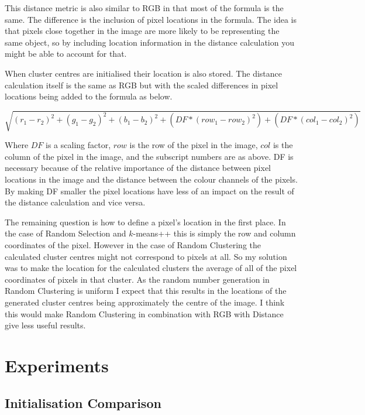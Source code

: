 \documentclass{article}
\begin{document}
This distance metric is also similar to RGB in that most of the formula is the same. The difference is the inclusion of pixel locations in the formula. The idea is that pixels close together in the image are more likely to be representing the same object, so by including location information in the distance calculation you might be able to account for that. 

When cluster centres are initialised their location is also stored. The distance calculation itself is the same as RGB but with the scaled differences in pixel locations being added to the formula as below.

\begin{equation*}
 \sqrt{(r_1-r_2)^2 + (g_1-g_2)^2 + (b_1-b_2)^2 + (DF*(row_1-row_2)^2) + (DF*(col_1-col_2)^2)}	
\end{equation*}


Where $DF$ is a scaling factor, $row$ is the row of the pixel in the image, $col$ is the column of the pixel in the image, and the subscript numbers are as above.
DF is necessary because of the relative importance of the distance between pixel locations in the image and the distance between the colour channels of the pixels. By making DF smaller the pixel locations have less of an impact on the result of the distance calculation and vice versa. 

The remaining question is how to define a pixel's location in the first place.
In the case of Random Selection and $k$-means++ this is simply the row and column coordinates of the pixel. However in the case of Random Clustering the calculated cluster centres might not correspond to pixels at all. So my solution was to make the location for the calculated clusters the average of all of the pixel coordinates of pixels in that cluster. As the random number generation in Random Clustering is uniform I expect that this results in the locations of the generated cluster centres being approximately the centre of the image. I think this would make Random Clustering in combination with RGB with Distance give less useful results. 

\section{Experiments}

\subsection{Initialisation Comparison}
\end{document}
